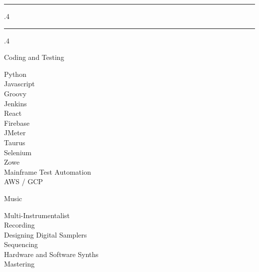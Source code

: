 \documentclass[10pt]{article}
\makeatletter
\newcommand*\rulefill[1][.4\p@]{%
    \leavevmode
    \leaders \hrule \@height #1\relax \hfill
    \null
  }
\makeatother
\begin{document}
\begin{minipage}[t]{0.325\linewidth}
	\textcolor{black!20}{\rulefill\quad 
		{\fontsize{14}{25}\selectfont \textsl{}} 
	\quad\rulefill}

\vspace{0.5cm}

	{\fontsize{16}{20}\selectfont \textcolor{black!65}{Coding and Testing}}

\vspace{-0.75cm}

	{\fontsize{13}{15}\selectfont \textcolor{black!45}{
		\begin{justify}
			Python				\\
			Javascript          \\
			Groovy              \\
			Jenkins             \\
			React               \\
			Firebase            \\
			JMeter              \\
			Taurus              \\
			Selenium	    	\\
			Zowe                \\
			Mainframe Test Automation   \\
			AWS / GCP                 \\
		\end{justify}}}





	{\fontsize{16}{20}\selectfont \textcolor{black!65}{Music}}

\vspace{-0.75cm}

	{\fontsize{13}{15}\selectfont \textcolor{black!45}{
		\begin{justify}
			Multi-Instrumentalist		\\
			Recording					\\
			Designing Digital Samplers  \\
			Sequencing					\\
			Hardware and Software Synths\\
			Mastering					\\
		\end{justify}}}

\end{minipage}
\end{document}
